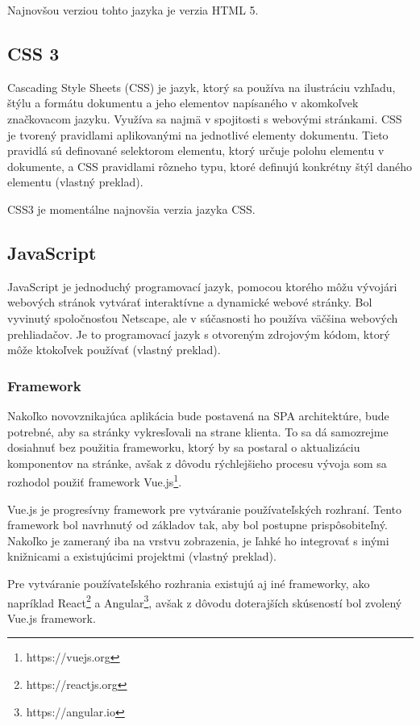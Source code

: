 Najnovšou verziou tohto jazyka je verzia HTML 5.

\subsection{CSS 3}
Cascading Style Sheets (CSS) je jazyk, ktorý sa používa na ilustráciu vzhľadu, štýlu a formátu dokumentu a jeho elementov napísaného v akomkoľvek značkovacom jazyku. Využíva sa najmä v spojitosti s webovými stránkami. CSS je tvorený pravidlami aplikovanými na jednotlivé elementy dokumentu. Tieto pravidlá sú definované selektorom elementu, ktorý určuje polohu elementu v dokumente, a CSS pravidlami rôzneho typu, ktoré definujú konkrétny štýl daného elementu \cite{co-je-css} (vlastný preklad). 

CSS3 je momentálne najnovšia verzia jazyka CSS.

\subsection{JavaScript}
JavaScript je jednoduchý programovací jazyk, pomocou ktorého môžu vývojári webových stránok vytvárať interaktívne a dynamické webové stránky. Bol vyvinutý spoločnosťou Netscape, ale v súčasnosti ho používa väčšina webových prehliadačov. Je to programovací jazyk s otvoreným zdrojovým kódom, ktorý môže ktokoľvek používať \cite{co-je-js} (vlastný preklad).

\subsubsection*{Framework}
Nakoľko novovznikajúca aplikácia bude postavená na SPA architektúre, bude potrebné, aby sa stránky vykresľovali na strane klienta. To sa dá samozrejme dosiahnuť bez použitia frameworku, ktorý by sa postaral o aktualizáciu komponentov na stránke, avšak z dôvodu rýchlejšieho procesu vývoja som sa rozhodol použiť framework Vue.js\footnote{https://vuejs.org}.

Vue.js je progresívny framework pre vytváranie používateľských rozhraní. Tento framework bol navrhnutý od základov tak, aby bol postupne prispôsobiteľný. Nakoľko je zameraný iba na vrstvu zobrazenia, je ľahké ho integrovať s inými knižnicami a existujúcimi projektmi \cite{co-je-vue} (vlastný preklad).

Pre vytváranie používateľského rozhrania existujú aj iné frameworky, ako napríklad React\footnote{https://reactjs.org} a Angular\footnote{https://angular.io}, avšak z dôvodu doterajších skúseností bol zvolený Vue.js framework.

